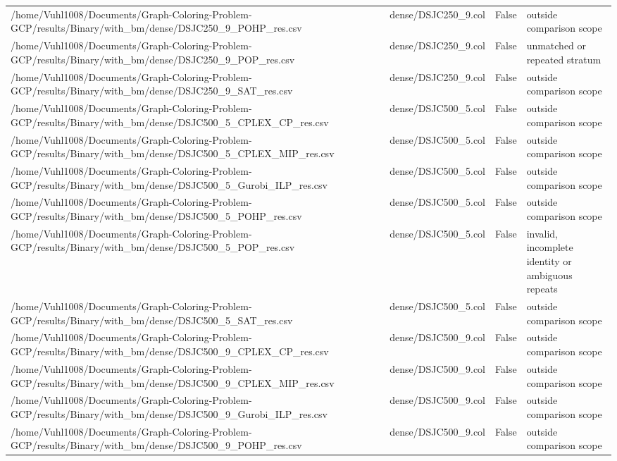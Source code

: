 \begin{table}[htbp]
\begin{tabular}{llll}
/home/Vuhl1008/Documents/Graph-Coloring-Problem-GCP/results/Binary/with\_bm/dense/DSJC250\_9\_POHP\_res.csv & dense/DSJC250\_9.col & False & outside comparison scope \\
/home/Vuhl1008/Documents/Graph-Coloring-Problem-GCP/results/Binary/with\_bm/dense/DSJC250\_9\_POP\_res.csv & dense/DSJC250\_9.col & False & unmatched or repeated stratum \\
/home/Vuhl1008/Documents/Graph-Coloring-Problem-GCP/results/Binary/with\_bm/dense/DSJC250\_9\_SAT\_res.csv & dense/DSJC250\_9.col & False & outside comparison scope \\
/home/Vuhl1008/Documents/Graph-Coloring-Problem-GCP/results/Binary/with\_bm/dense/DSJC500\_5\_CPLEX\_CP\_res.csv & dense/DSJC500\_5.col & False & outside comparison scope \\
/home/Vuhl1008/Documents/Graph-Coloring-Problem-GCP/results/Binary/with\_bm/dense/DSJC500\_5\_CPLEX\_MIP\_res.csv & dense/DSJC500\_5.col & False & outside comparison scope \\
/home/Vuhl1008/Documents/Graph-Coloring-Problem-GCP/results/Binary/with\_bm/dense/DSJC500\_5\_Gurobi\_ILP\_res.csv & dense/DSJC500\_5.col & False & outside comparison scope \\
/home/Vuhl1008/Documents/Graph-Coloring-Problem-GCP/results/Binary/with\_bm/dense/DSJC500\_5\_POHP\_res.csv & dense/DSJC500\_5.col & False & outside comparison scope \\
/home/Vuhl1008/Documents/Graph-Coloring-Problem-GCP/results/Binary/with\_bm/dense/DSJC500\_5\_POP\_res.csv & dense/DSJC500\_5.col & False & invalid, incomplete identity or ambiguous repeats \\
/home/Vuhl1008/Documents/Graph-Coloring-Problem-GCP/results/Binary/with\_bm/dense/DSJC500\_5\_SAT\_res.csv & dense/DSJC500\_5.col & False & outside comparison scope \\
/home/Vuhl1008/Documents/Graph-Coloring-Problem-GCP/results/Binary/with\_bm/dense/DSJC500\_9\_CPLEX\_CP\_res.csv & dense/DSJC500\_9.col & False & outside comparison scope \\
/home/Vuhl1008/Documents/Graph-Coloring-Problem-GCP/results/Binary/with\_bm/dense/DSJC500\_9\_CPLEX\_MIP\_res.csv & dense/DSJC500\_9.col & False & outside comparison scope \\
/home/Vuhl1008/Documents/Graph-Coloring-Problem-GCP/results/Binary/with\_bm/dense/DSJC500\_9\_Gurobi\_ILP\_res.csv & dense/DSJC500\_9.col & False & outside comparison scope \\
/home/Vuhl1008/Documents/Graph-Coloring-Problem-GCP/results/Binary/with\_bm/dense/DSJC500\_9\_POHP\_res.csv & dense/DSJC500\_9.col & False & outside comparison scope \\

\end{tabular}
\end{table}
